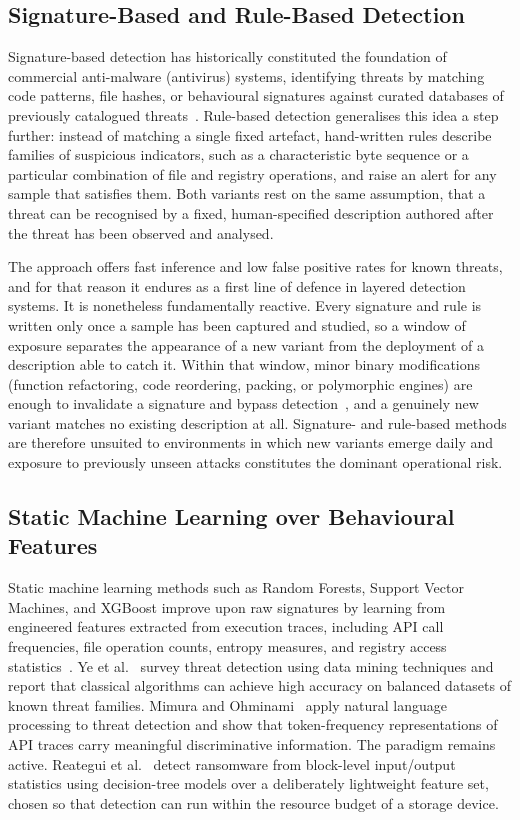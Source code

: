 \documentclass[%
    BCOR=10mm,
    DIV=13,
    toc=bibliography,
    toc=listof,
    oneside,
    12pt,
]{scrbook}
\begin{document}
\subsection{Signature-Based and Rule-Based Detection}
\label{subsec:signature}

Signature-based detection has historically constituted the foundation of
commercial anti-malware (antivirus) systems, identifying threats by matching
code patterns, file hashes, or behavioural signatures against curated databases
of previously catalogued threats~\cite{ucci2019survey}. Rule-based detection
generalises this idea a step further: instead of matching a single fixed
artefact, hand-written rules describe families of suspicious indicators, such as
a characteristic byte sequence or a particular combination of file and registry
operations, and raise an alert for any sample that satisfies them. Both variants
rest on the same assumption, that a threat can be recognised by a fixed,
human-specified description authored after the threat has been observed and
analysed.

The approach offers fast inference and low false positive rates for known
threats, and for that reason it endures as a first line of defence in layered
detection systems. It is nonetheless fundamentally reactive. Every signature and
rule is written only once a sample has been captured and studied, so a window of
exposure separates the appearance of a new variant from the deployment of a
description able to catch it. Within that window, minor binary modifications
(function refactoring, code reordering, packing, or polymorphic engines) are
enough to invalidate a signature and bypass detection~\cite{guo2023zeroday},
and a genuinely new variant matches no existing description at all. Signature-
and rule-based methods are therefore unsuited to environments in which new
variants emerge daily and exposure to previously unseen attacks constitutes the
dominant operational risk.

\subsection{Static Machine Learning over Behavioural Features}
\label{subsec:static_ml}
Static machine learning methods such as Random Forests, Support Vector
Machines, and XGBoost improve upon raw signatures by learning from engineered
features extracted from execution traces, including API call frequencies, file
operation counts, entropy measures, and registry access
statistics~\cite{ucci2019survey, ye2017survey}. Ye et al.~\cite{ye2017survey}
survey threat detection using data mining techniques and report that
classical algorithms can achieve high accuracy on balanced datasets of known
threat families. Mimura and Ohminami~\cite{mimura2022nlp} apply natural
language processing to threat detection and show that token-frequency
representations of API traces carry meaningful discriminative information. The
paradigm remains active. Reategui et al.~\cite{reategui2024} detect ransomware
from block-level input/output statistics using decision-tree models over a
deliberately lightweight feature set, chosen so that detection can run within
the resource budget of a storage device.
\end{document}
